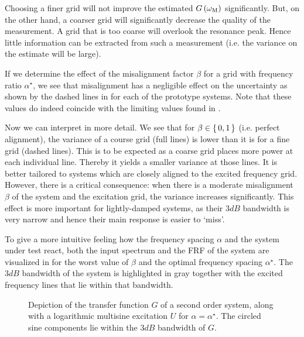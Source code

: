   Choosing a finer grid will not improve the estimated $G\left( \omega_{\mathrm{M}} \right)$ significantly.
  But, on the other hand, a coarser grid will significantly decrease the quality of the measurement.
  A grid that is too coarse will overlook the resonance peak.
  Hence little information can be extracted from such a measurement (i.e. the variance on the estimate will be large).

  If we determine the effect of the misalignment factor $\beta$ for a grid with frequency ratio $\alpha^{\star}$, we see that misalignment has a negligible effect on the uncertainty as shown by the dashed lines in  for each of the prototype systems.
  Note that these values do indeed coincide with the limiting values found in .
  
  Now we can interpret  in more detail.
  We see that for $\beta \in \set{0,1}$ (i.e. perfect alignment), the variance of a course grid (full lines) is lower than it is for a fine grid (dashed lines).
  This is to be expected as a coarse grid places more power at each individual line.
  Thereby it yields a smaller variance at those lines.
  It is better tailored to systems which are closely aligned to the excited frequency grid.
  However, there is a critical consequence: when there is a moderate misalignment $\beta$ of the system and the excitation grid, the variance increases significantly.
  This effect is more important for lightly-damped systems, as their $3\unit{dB}$ bandwidth is very narrow and hence their main response is easier to `miss'.

  To give a more intuitive feeling how the frequency spacing $\alpha$ and the system under test react, both the input spectrum and the FRF of the system are visualized in  for the worst value of $\beta$ and the optimal frequency spacing $\alpha^{\star}$.
  The $3\unit{dB}$ bandwidth of the system is highlighted in gray together with the excited frequency lines that lie within that bandwidth.

  \begin{figure}%
    \centering
      \setlength\figureheight{4cm}
      \setlength{}
    
    \caption[System with highlighted bandwidth and multisine components.]{Depiction of the transfer function $G$ of a second order system, along with a logarithmic multisine excitation $U$ for $\alpha = \alpha^{\star}$. The circled sine components lie within the $3 \unit{dB}$ bandwidth of $G$.}%
    \label{fig:signalAndSystem}
  \end{figure}

